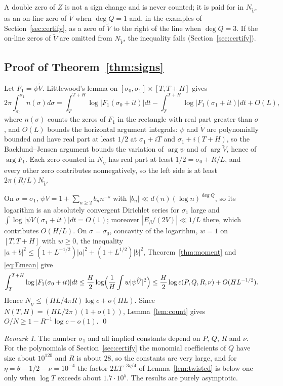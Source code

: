 \documentclass[11pt]{article}
\theoremstyle{remark}
\newtheorem{remark}[theorem]{Remark}
\newcommand{\Vt}{\widetilde V}
\begin{document}
A double zero of $Z$ is not a sign change and is never counted; it is paid
for in $N_{\Vt}$, as an on-line zero of $\Vt$ when $\deg Q=1$ and, in the
examples of Section~\ref{sec:certify}, as a zero of $\Vt$ to the right of the
line when $\deg Q=3$. If the on-line zeros of $\Vt$ are omitted from
$N_{\Vt}$, the inequality fails (Section~\ref{sec:certify}).

\subsection{Proof of Theorem~\ref{thm:signs}}

Let $F_1=\psi\Vt$. Littlewood's lemma on $[\sigma_0,\sigma_1]\times[T,T+H]$
gives
\[
 2\pi\int_{\sigma_0}^{\sigma_1}n(\sigma)d\sigma=
 \int_T^{T+H}\log|F_1(\sigma_0+it)|dt-\int_T^{T+H}\log|F_1(\sigma_1+it)|dt+O(L),
\]
where $n(\sigma)$ counts the zeros of $F_1$ in the rectangle with real part
greater than $\sigma$, and $O(L)$ bounds the horizontal argument integrals:
$\psi$ and $\Vt$ are polynomially bounded and have real part at least $1/2$ at
$\sigma_1+iT$ and $\sigma_1+i(T+H)$, so the Backlund--Jensen argument bounds
the variation of $\arg\psi$ and of $\arg\Vt$, hence of $\arg F_1$. Each zero counted in $N_{\Vt}$ has real
part at least $1/2=\sigma_0+R/L$, and every other zero contributes
nonnegatively, so the left side is at least $2\pi(R/L)N_{\Vt}$.

On $\sigma=\sigma_1$, $\psi V=1+\sum_{n\ge2}b_nn^{-s}$ with
$|b_n|\ll d(n)(\log n)^{\deg Q}$, so its logarithm is an absolutely
convergent Dirichlet series for $\sigma_1$ large and
$\int\log|\psi V(\sigma_1+it)|dt=O(1)$; moreover $|E_\beta/(2V)|\ll1/L$ there,
which contributes $O(H/L)$. On $\sigma=\sigma_0$, concavity of the logarithm,
$w=1$ on $[T,T+H]$ with $w\ge0$, the inequality
$|a+b|^2\le(1+L^{-1/2})|a|^2+(1+L^{1/2})|b|^2$, Theorem~\ref{thm:moment} and
\eqref{eq:Emean} give
\[
 \int_T^{T+H}\log|F_1(\sigma_0+it)|dt\le\frac H2\log\Bigl(\frac1H\int
 w|\psi\Vt|^2\Bigr)\le\frac H2\log c(P,Q,R,\nu)+O(HL^{-1/2}).
\]
Hence $N_{\Vt}\le(HL/4\pi R)\log c+o(HL)$. Since $N(T,H)=(HL/2\pi)(1+o(1))$,
Lemma~\ref{lem:count} gives $O/N\ge1-R^{-1}\log c-o(1)$. \qed

\begin{remark}
The number $\sigma_1$ and all implied constants depend on $P$, $Q$, $R$ and
$\nu$. For the polynomials of Section~\ref{sec:certify} the monomial
coefficients of $Q$ have size about $10^{120}$ and $R$ is about $28$, so the
constants are very large, and for $\eta=\theta-1/2-\nu=10^{-4}$ the factor
$2LT^{-3\eta/4}$ of Lemma~\ref{lem:twisted} is below one only when $\log T$
exceeds about $1.7\cdot10^5$. The results are purely asymptotic.
\end{remark}
\end{document}
